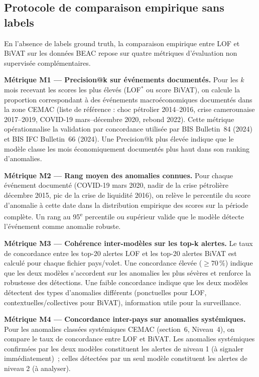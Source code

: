 \documentclass[12pt,a4paper]{article}
\begin{document}
\subsection{Protocole de comparaison empirique sans labels}

En l'absence de labels ground truth, la comparaison empirique entre LOF et
BiVAT sur les données BEAC repose sur quatre métriques d'évaluation non
supervisée complémentaires.

\textbf{Métrique M1 --- Precision@k sur événements documentés.}
Pour les $k$ mois recevant les scores les plus élevés (LOF$^*$ ou score BiVAT),
on calcule la proportion correspondant à des événements macroéconomiques
documentés dans la zone CEMAC (liste de référence : choc pétrolier
2014--2016, crise camerounaise 2017--2019, COVID-19 mars--décembre 2020,
rebond 2022). Cette métrique opérationnalise la validation par concordance
utilisée par BIS Bulletin~84 (2024) et BIS IFC Bulletin~66 (2024). Une
Precision@k plus élevée indique que le modèle classe les mois économiquement
documentés plus haut dans son ranking d'anomalies.

\textbf{Métrique M2 --- Rang moyen des anomalies connues.}
Pour chaque événement documenté (COVID-19 mars 2020, nadir de la crise
pétrolière décembre 2015, pic de la crise de liquidité 2016), on relève le
percentile du score d'anomalie à cette date dans la distribution empirique
des scores sur la période complète. Un rang au 95\textsuperscript{e} percentile
ou supérieur valide que le modèle détecte l'événement comme anomalie robuste.

\textbf{Métrique M3 --- Cohérence inter-modèles sur les top-k alertes.}
Le taux de concordance entre les top-20 alertes LOF et les top-20 alertes
BiVAT est calculé pour chaque fichier pays/volet. Une concordance élevée
($\geq 70\,\%$) indique que les deux modèles s'accordent sur les anomalies
les plus sévères et renforce la robustesse des détections. Une faible
concordance indique que les deux modèles détectent des types d'anomalies
différents (ponctuelles pour LOF, contextuelles/collectives pour BiVAT),
information utile pour la surveillance.

\textbf{Métrique M4 --- Concordance inter-pays sur anomalies systémiques.}
Pour les anomalies classées systémiques CEMAC (section~6, Niveau~4), on
compare le taux de concordance entre LOF et BiVAT. Les anomalies systémiques
confirmées par les deux modèles constituent les alertes de niveau 1 (à
signaler immédiatement)~; celles détectées par un seul modèle constituent
les alertes de niveau 2 (à analyser).
\end{document}
